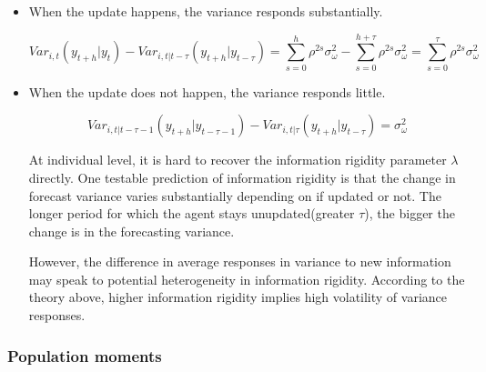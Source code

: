 \documentclass[]{article}
\begin{document}
\begin{itemize}
\item When the update happens, the variance responds substantially.  

$$Var_{i,t}(y_{t+h}|y_t) - Var_{i,t|t-\tau}(y_{t+h}|y_{t-\tau}) = \sum^{h}_{s=0}\rho^{2s} \sigma^2_{\omega} - \sum^{h+\tau}_{s=0}\rho^{2s} \sigma^2_{\omega} = \sum^{\tau}_{s=0} \rho^{2s}\sigma^2_{\omega}$$

\item When the update does not happen, the variance responds little. 

$$Var_{i,t|t-\tau-1}(y_{t+h}|y_{t-\tau-1}) - Var_{i,t|\tau}(y_{t+h}|y_{t-\tau}) = \sigma^2_{\omega}$$

At individual level, it is hard to recover the information rigidity parameter $\lambda$ directly. One testable prediction of information rigidity is that the change in forecast variance varies substantially depending on if updated or not. The longer period for which the agent stays unupdated(greater $\tau$), the bigger the change is in the forecasting variance. 

However, the difference in average responses in variance to new information may speak to potential heterogeneity in information rigidity. According to the theory above, higher information rigidity implies high volatility of variance responses.  
\end{itemize}

\subsubsection{Population moments} 
	
\end{document}
